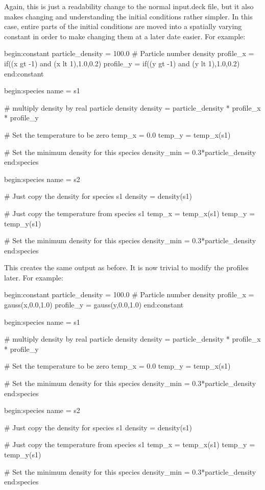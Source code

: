 Again, this is just a readability change to the normal input.deck file, but it
also makes changing and understanding the initial conditions rather
simpler. In this case, entire parts of the initial conditions are moved into a
spatially varying constant in order to make changing them at a later date
easier. For example:
\begin{boxverbatim}
begin:constant
   particle_density = 100.0 # Particle number density
   profile_x = if((x gt -1) and (x lt 1),1.0,0.2)
   profile_y = if((y gt -1) and (y lt 1),1.0,0.2)
end:constant

begin:species
   name = s1

   # multiply density by real particle density
   density = particle_density * profile_x * profile_y

   # Set the temperature to be zero
   temp_x = 0.0
   temp_y = temp_x(s1)

   # Set the minimum density for this species
   density_min = 0.3*particle_density
end:species

begin:species
   name = s2

   # Just copy the density for species s1
   density = density(s1)

   # Just copy the temperature from species s1
   temp_x = temp_x(s1)
   temp_y = temp_y(s1)

   # Set the minimum density for this species
   density_min = 0.3*particle_density
end:species
\end{boxverbatim}

This creates the same output as before. It is now trivial to modify the
profiles later. For example:
\begin{boxverbatim}
begin:constant
   particle_density = 100.0 # Particle number density
   profile_x = gauss(x,0.0,1.0)
   profile_y = gauss(y,0.0,1.0)
end:constant

begin:species
   name = s1

   # multiply density by real particle density
   density = particle_density * profile_x * profile_y

   # Set the temperature to be zero
   temp_x = 0.0
   temp_y = temp_x(s1)

   # Set the minimum density for this species
   density_min = 0.3*particle_density
end:species

begin:species
   name = s2

   # Just copy the density for species s1
   density = density(s1)

   # Just copy the temperature from species s1
   temp_x = temp_x(s1)
   temp_y = temp_y(s1)

   # Set the minimum density for this species
   density_min = 0.3*particle_density
end:species
\end{boxverbatim}

